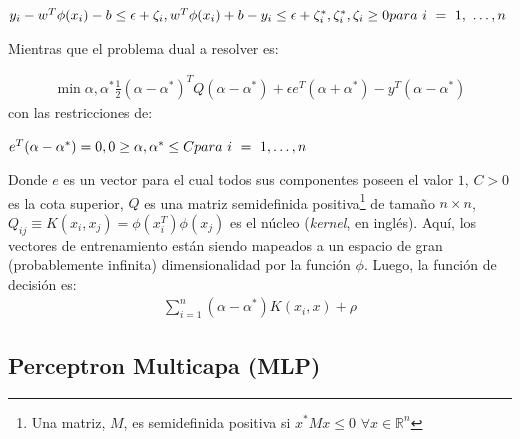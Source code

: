       \begin{math}
        y_{i} - w^{T} \phi(x_{i}) - b \leq \epsilon + \zeta_{i}, \\
        w^{T} \phi(x_{i}) + b - y_{i} \leq \epsilon + \zeta^{*}_{i}, \\
              \zeta^{*}_{i}, \zeta_{i} \geq 0 \\
        para\ i\ =\ 1,\ \dots, n
      \end{math}

      Mientras que el problema dual a resolver es:

      \begin{align}
        \min\limits{\alpha, \alpha^{*}} \frac{1}{2} (\alpha - \alpha^{*})^{T}
        Q(\alpha - \alpha^{*}) + \epsilon e^{T} (\alpha + \alpha^{*}) -
        y^{T} (\alpha - \alpha^{*})
      \end{align}
      con las restricciones de:

      \begin{math}
        e^{T} (\alpha - \alpha^{*}) = 0, \\
        0 \geq \alpha, \alpha^{*} \leq C \\
        para\ i\ =\ 1, \dots, n
      \end{math}

    \par Donde $e$ es un vector para el cual todos sus componentes poseen el valor $1$, $C > 0$
      es la cota superior, $Q$ es una matriz semidefinida
      positiva\footnote{Una matriz, $M$, es semidefinida positiva si $x^{*}Mx \leq 0$
      $\forall x \in \mathbb{R}^{n}$} de tamaño $n \times n$,
      $Q_{ij} \equiv K(x_{i}, x_{j}) = \phi(x_{i}^{T})\phi(x_{j})$ es el núcleo
      (\textit{kernel}, en inglés). Aquí, los vectores de entrenamiento están siendo mapeados
      a un espacio de gran (probablemente infinita) dimensionalidad por la función
      $\phi$.
      Luego, la función de decisión es:
      \begin{align}
        \sum_{i = 1}^{n} (\alpha - \alpha^{*})K(x_{i}, x) + \rho
      \end{align}

  \subsection{Perceptron Multicapa (MLP)}

